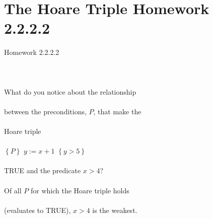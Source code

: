 \documentclass{article}
\begin{document}
\section{The Hoare Triple Homework 2.2.2.2}

Homework 2.2.2.2
\\
\\
\\
\\
What do you notice about the relationship
\\
\\
between the preconditions, $P$, that make the 
\\
\\
Hoare triple
\\
\\
$\left\{P\right\}$ $y := x + 1$ $\left\{y > 5\right\}$
\\
\\
TRUE and the predicate $x > 4$?
\\
\\
Of all $P$ for which the Hoare triple holds 
\\
\\
(evaluates to TRUE), $x > 4$ is the weakest.
\\
\\
\end{document}
